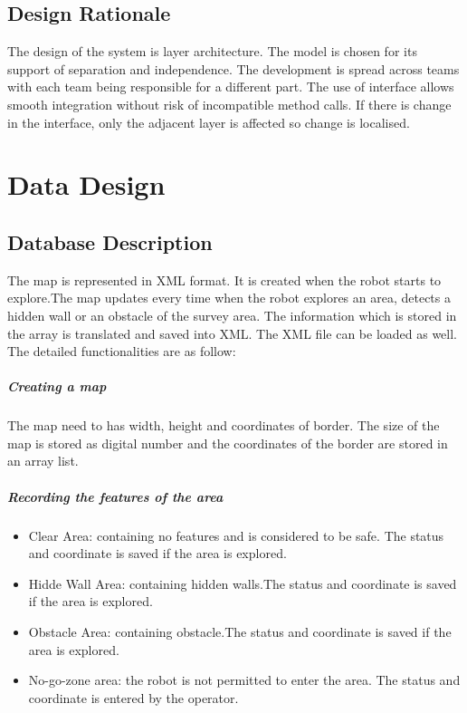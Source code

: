 \documentclass[11pt, a4paper]{report}
\begin{document}
\section{Design Rationale}
The design of the system is layer architecture. The model is chosen for its support of separation
and independence. The development is spread across teams with each team being responsible
for a different part. The use of interface allows smooth integration without risk of
 incompatible method calls. If there is change in the interface, only the adjacent layer is affected
 so change is localised.

\pagebreak


\chapter{Data Design}%
\label{cha:DD1}

\section{Database Description}
The map is represented in XML format. It is created when the robot starts to explore.The map updates every time when the robot explores an area, detects
a hidden wall or an obstacle of the survey area. The information which is stored in the array is translated
and saved into XML. The XML file can be loaded as well. The detailed functionalities are
as follow:

\paragraph{Creating a map}

The map need to has width, height and coordinates of border. The size of the map is stored as digital number and the coordinates of the border are stored in an array list.

\paragraph{Recording the features of the area}

\begin{itemize}
\item  Clear Area: containing no features and is considered to be safe. The status and coordinate is saved if the area is explored.
\item	Hidde Wall Area: containing hidden walls.The status and coordinate is saved if the area is explored.
\item  Obstacle Area: containing obstacle.The status and coordinate is saved if the area is explored.
\item  No-go-zone area: the robot is not permitted to enter the area. The status and coordinate is entered by the operator.
\end{itemize}
\end{document}
